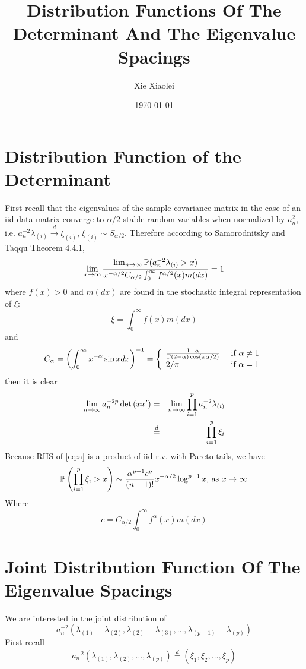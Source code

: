 \documentclass{article}
\title{Distribution Functions Of The Determinant And The Eigenvalue Spacings}
\author{Xie Xiaolei}
\date{\today}
\begin{document}
\maketitle
\section{Distribution Function of the Determinant}
First recall that the eigenvalues of the sample covariance matrix in
the case of an iid data matrix converge to $\alpha/2$-stable random
variables when normalized by $a_n^2$, i.e. $a_n^{-2} \lambda_{(i)}
\overset{d}{\to} \xi_{(i)}$, $\xi_{(i)} \sim S_{\alpha/2}$. Therefore
according to Samorodnitsky and Taqqu\cite{SamorodnitskyTaqqu1994}
Theorem 4.4.1,
\[
\lim_{x \to \infty} \frac{
  \lim_{n \to \infty} \P(a_n^{-2} \lambda_{(i)} > x)
}{
  x^{-\alpha/2} C_{\alpha/2} \int_{0}^{\infty} f^{\alpha/2}(x) m(dx)
} = 1
\]
where $f(x) > 0$ and $m(dx)$ are found in the stochastic integral
representation of $\xi$:
\[
\xi=\int_{0}^\infty f(x) m(dx)
\]
and
\[
C_\alpha = \left(
\int_0^\infty x^{-\alpha} \sin x dx
\right)^{-1} = \left\{
  \begin{array}{ll}
    {1 - \alpha \over \Gamma(2 - \alpha) \cos(\pi \alpha / 2)} & \text{ if } \alpha \neq 1
    \\
    2/\pi & \text{ if }\alpha = 1
  \end{array}
\right.
\]
then it is clear
\begin{eqnarray}
  \lim_{n \to \infty} a_n^{-2p} \det \mtx(xx') &=& \lim_{n \to \infty}
  \prod_{i=1}^p a_n^{-2} \lambda_{(i)} \nonumber \\
  &\overset{d}{=}& \prod_{i=1}^p \xi_{i} \label{eq:a}
\end{eqnarray}
Because RHS of \eqref{eq:a} is a product of iid r.v. with Pareto
tails, we have
\[
\P\left(
\prod_{i=1}^p \xi_{i} > x
\right) \sim {\alpha^{p-1} c^p \over (n-1)!}  x^{-\alpha/2} \log^{p-1} x 
\text{, as } x \to \infty
\]
Where
\[
c =  C_{\alpha/2} \int_{0}^{\infty} f^\alpha(x) m(dx)
\]

\section{Joint Distribution Function Of The Eigenvalue Spacings}
We are interested in the joint distribution of
\[
a_n^{-2}(\lambda_{(1)} - \lambda_{(2)}, \lambda_{(2)} - \lambda_{(3)}, \dots, \lambda_{(p-1)} - \lambda_{(p)})
\]
First recall
\[
a_n^{-2}(\lambda_{(1)}, \lambda_{(2)}, \dots, \lambda_{(p)})
\overset{d}{=} (\xi_1, \xi_2, \dots, \xi_p)
\]
\end{document}
